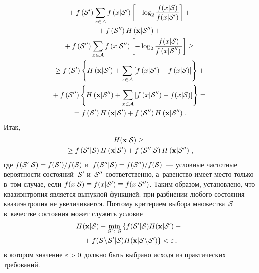 \begin{multicols}{2}
\noindent
\begin{multline*}
{}+
f\left({\cal S}'\right)\sum\limits_{x\in{\cal A}}
    f\left(x|{\cal S}'\right) \left[-\log_{2}\displaystyle\frac{\displaystyle f(x|{\cal S})\mathstrut}{\displaystyle f(x|{\cal S}')\mathstrut}\right] +{}\\
{}+ f\left({\cal S}''\right) H\left(\mathbf{x}|{\cal S}''\right) +{}\\
{}+
f\left({\cal S}''\right)\sum\limits_{x\in{\cal A}}
    f\left(x|{\cal S}''\right) \left[-\log_{2}\displaystyle\frac{\displaystyle f(x|{\cal S})\mathstrut}{\displaystyle f\left(x|{\cal S}''\right)\mathstrut}\right] \ge{} \\
{}\ge f\left({\cal S}'\right)\left\{H\left(\mathbf{x}|{\cal S}'\right) +
\sum\limits_{x\in{\cal A}} \left[f\left(x|{\cal S}'\right)-
f\left(x|{\cal S}\right)\right] \right\} +{}\\
{}+
f\left({\cal S}''\right)\left\{H\left(\mathbf{x}|{\cal S}''\right) +
\sum\limits_{x\in{\cal A}} \left[f\left(x|{\cal S}''\right)-
f(x|{\cal S})\right] \right\} ={} \\
{}= f\left({\cal S}'\right) H\left(\mathbf{x}|{\cal S}'\right) + 
f\left({\cal S}''\right) H\left(\mathbf{x}|{\cal S}''\right)\,.
\end{multline*}
Итак,
\begin{multline}
\label{eq14}
H(\mathbf{x}|{\cal S}) \ge{}\\
{}\ge
f\left({\cal S}'|{\cal S}\right) H\left(\mathbf{x}|{\cal S}'\right) + 
f\left({\cal S}''|{\cal S}\right) H\left(\mathbf{x}|{\cal S}''\right)\,,
\end{multline}
где $f({\cal S}'|{\cal S})\hm=f({\cal S}')/f({\cal S})$ 
и~$f({\cal S}''|{\cal S})\hm=f({\cal S}'')/f({\cal S})$~--- 
условные частотные вероятности состояний~${\cal S}'$ и~${\cal S}''$ 
соответственно, а~равенство имеет место только в~том случае, если $f(x|{\cal S})
\equiv f(x|{\cal S}')\equiv f(x|{\cal S}'')$. Таким образом, установлено, 
что квазиэнтропия является выпуклой функцией: при разбиении любого состояния 
квазиэнтропия не увеличивается. Поэтому критерием выбора множества~${\cal S}$ 
в~качестве состояния может служить условие
\begin{multline*}
H(\mathbf{x}|{\cal S}) -
\min\limits_{{\cal S}'\subset{\cal S}}
\left\{ f({\cal S}'|{\cal S}) H(\mathbf{x}|{\cal S}') +{}\right.\\
\left.{}+
f({\cal S}\!\setminus\!{\cal S}'|{\cal S}) H(\mathbf{x}|{\cal S}\!\setminus\!{\cal S}') 
\right\} < \varepsilon\,,
\end{multline*}
в котором значение $\varepsilon\hm>0$ должно быть выбрано исходя из 
практических требований.


\end{multicols}
